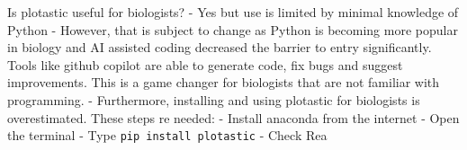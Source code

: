 


Is plotastic useful for biologists?
- Yes but use is limited by minimal knowledge of Python
- However, that is subject to change as Python is becoming more popular
in biology and AI assisted coding decreased the barrier to entry
significantly. Tools like github copilot are able to generate code, fix
bugs and suggest improvements. This is a game changer for biologists
that are not familiar with programming.
- Furthermore, installing and using plotastic for biologists is overestimated. These
steps re needed:
- Install anaconda from the internet
- Open the terminal
- Type \texttt{pip install plotastic}
- Check Rea
